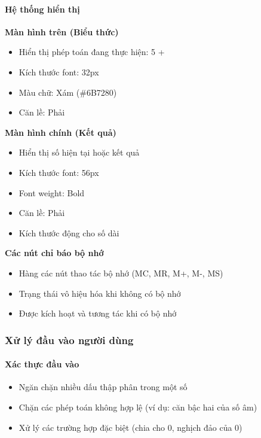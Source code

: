 \paragraph{Hệ thống hiển thị}

\textbf{Màn hình trên (Biểu thức)}
\begin{itemize}
    \item Hiển thị phép toán đang thực hiện: 5 +
    \item Kích thước font: 32px
    \item Màu chữ: Xám (\#6B7280)
    \item Căn lề: Phải
\end{itemize}

\textbf{Màn hình chính (Kết quả)}
\begin{itemize}
    \item Hiển thị số hiện tại hoặc kết quả
    \item Kích thước font: 56px
    \item Font weight: Bold
    \item Căn lề: Phải
    \item Kích thước động cho số dài
\end{itemize}

\textbf{Các nút chỉ báo bộ nhớ}
\begin{itemize}
    \item Hàng các nút thao tác bộ nhớ (MC, MR, M+, M-, MS)
    \item Trạng thái vô hiệu hóa khi không có bộ nhớ
    \item Được kích hoạt và tương tác khi có bộ nhớ
\end{itemize}

\subsubsection{Xử lý đầu vào người dùng}

\paragraph{Xác thực đầu vào}
\begin{itemize}
    \item Ngăn chặn nhiều dấu thập phân trong một số
    \item Chặn các phép toán không hợp lệ (ví dụ: căn bậc hai của số âm)
    \item Xử lý các trường hợp đặc biệt (chia cho 0, nghịch đảo của 0)
\end{itemize}

